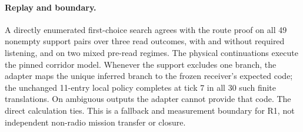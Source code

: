 \documentclass{article}
\begin{document}
\paragraph{Replay and boundary.}
A directly enumerated first-choice search agrees with the route proof on all 49 nonempty support pairs over three read outcomes, with and without required listening, and on two mixed pre-read regimes. The physical continuations execute the pinned corridor model. Whenever the support excludes one branch, the adapter maps the unique inferred branch to the frozen receiver's expected code; the unchanged 11-entry local policy completes at tick 7 in all 30 such finite translations. On ambiguous outputs the adapter cannot provide that code. The direct calculation ties. This is a fallback and measurement boundary for R1, not independent non-radio mission transfer or closure.
\end{document}
